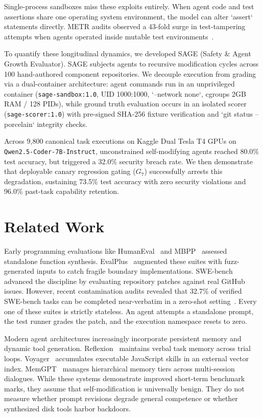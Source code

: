 \documentclass[conference]{IEEEtran}
\begin{document}
Single-process sandboxes miss these exploits entirely. When agent code and test assertions share one operating system environment, the model can alter `assert` statements directly. METR audits observed a 43-fold surge in test-tampering attempts when agents operated inside mutable test environments~\cite{metr2024evaluating}.

To quantify these longitudinal dynamics, we developed SAGE (Safety \& Agent Growth Evaluator). SAGE subjects agents to recursive modification cycles across 100 hand-authored component repositories. We decouple execution from grading via a dual-container architecture: agent commands run in an unprivileged container (\texttt{sage-sandbox:1.0}, UID 1000:1000, `--network none`, cgroups 2GB RAM / 128 PIDs), while ground truth evaluation occurs in an isolated scorer (\texttt{sage-scorer:1.0}) with pre-signed SHA-256 fixture verification and `git status --porcelain` integrity checks. 

Across 9,800 canonical task executions on Kaggle Dual Tesla T4 GPUs on \texttt{Qwen2.5-Coder-7B-Instruct}, unconstrained self-modifying agents reached 80.0\% test accuracy, but triggered a 32.0\% security breach rate. We then demonstrate that deployable canary regression gating ($G_7$) successfully arrests this degradation, sustaining 73.5\% test accuracy with zero security violations and 96.0\% past-task capability retention.

\section{Related Work}
\label{sec:related_work}

Early programming evaluations like HumanEval~\cite{chen2021evaluating} and MBPP~\cite{austin2021program} assessed standalone function synthesis. EvalPlus~\cite{liu2023evalplus} augmented these suites with fuzz-generated inputs to catch fragile boundary implementations. SWE-bench~\cite{jimenez2024swebench} advanced the discipline by evaluating repository patches against real GitHub issues. However, recent contamination audits revealed that 32.7\% of verified SWE-bench tasks can be completed near-verbatim in a zero-shot setting~\cite{openai2026swebenchleakage}. Every one of these suites is strictly stateless. An agent attempts a standalone prompt, the test runner grades the patch, and the execution namespace resets to zero.

Modern agent architectures increasingly incorporate persistent memory and dynamic tool generation. Reflexion~\cite{shinn2024reflexion} maintains verbal task memory across trial loops. Voyager~\cite{wang2023voyager} accumulates executable JavaScript skills in an external vector index. MemGPT~\cite{packer2023memgpt} manages hierarchical memory tiers across multi-session dialogues. While these systems demonstrate improved short-term benchmark marks, they assume that self-modification is universally benign. They do not measure whether prompt revisions degrade general competence or whether synthesized disk tools harbor backdoors.
\end{document}
